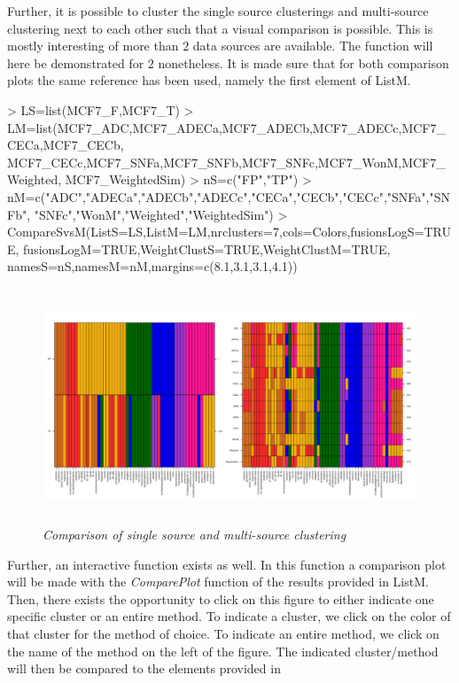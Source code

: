 \documentclass[a4paper]{article}
\begin{document}
Further, it is possible to cluster the single source clusterings and
multi-source clustering next to each other such that a visual comparison is
possible. This is mostly interesting of more than $2$ data sources are
available. The function will here be demonstrated for $2$ nonetheless.
It is made sure that for both comparison plots the same reference has been used,
namely the first element of ListM.
\begin{Schunk}
\begin{Sinput}
> LS=list(MCF7_F,MCF7_T)
> LM=list(MCF7_ADC,MCF7_ADECa,MCF7_ADECb,MCF7_ADECc,MCF7_CECa,MCF7_CECb,
 		MCF7_CECc,MCF7_SNFa,MCF7_SNFb,MCF7_SNFc,MCF7_WonM,MCF7_Weighted,
 		MCF7_WeightedSim)
> nS=c("FP","TP")
> nM=c("ADC","ADECa","ADECb","ADECc","CECa","CECb","CECc","SNFa","SNFb",
       "SNFc","WonM","Weighted","WeightedSim")
> CompareSvsM(ListS=LS,ListM=LM,nrclusters=7,cols=Colors,fusionsLogS=TRUE,
 		fusionsLogM=TRUE,WeightClustS=TRUE,WeightClustM=TRUE,
 		namesS=nS,namesM=nM,margins=c(8.1,3.1,3.1,4.1))
\end{Sinput}
\end{Schunk}
\begin{figure}[H]  
\centering
\includegraphics[width=14cm,height=7cm]{CompareSvsM.pdf}
\caption{{\it Comparison of single source and multi-source
clustering}\label{MCF7_SvsM}}
\end{figure}
\noindent Further, an interactive function exists as well. In this function a
comparison plot will be made with the {\it ComparePlot} function of the results
provided in ListM. Then, there exists the opportunity to click on this figure to
either indicate one specific cluster or an entire method. To indicate a cluster,
we click on the color of that cluster for the method of choice. To indicate an
entire method, we click on the name of the method on the left of the figure.
The indicated cluster/method will then be compared to the elements provided in
\end{document}
